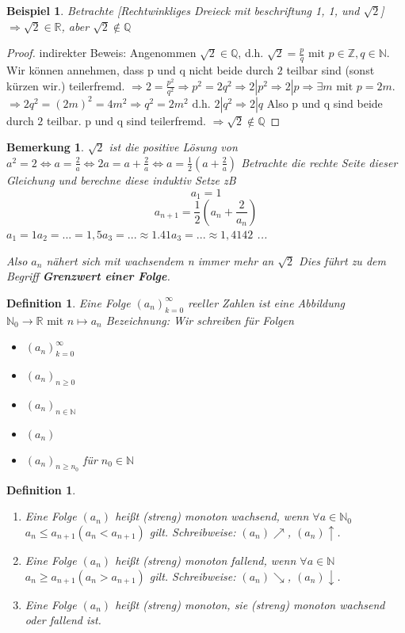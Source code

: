 \documentclass[a4paper,titlepage,oneside]{article}
\def\N{\ensuremath{\mathbb{N}} }
\def\Q{\ensuremath{\mathbb{Q}} }
\def\Z{\ensuremath{\mathbb{Z}} }
\def\R{\ensuremath{\mathbb{R}} }
\def\WSP{\text{\faBolt}}
\newcommand{\fain}[2]{\ensuremath{\forall#1\in#2}}
\theoremstyle{thmstyle}
\newtheorem{defi}[satz]{Definition}
\newtheorem{bsp}[satz]{Beispiel}
\newtheorem{bem}[satz]{Bemerkung}
\begin{document}
\begin{bsp}
Betrachte [Rechtwinkliges Dreieck mit beschriftung 1, 1, und $\sqrt{2}$]
\( \Rightarrow \sqrt{2} \in \R\), aber \(\sqrt{2} \not\in \Q\)
\end{bsp}
\begin{proof}
indirekter Beweis: Angenommen \(\sqrt{2} \in \Q\), d.h. 
$\sqrt{2} = \frac{p}{q}\text{ mit }p \in \Z, q \in \N.$
Wir können annehmen, dass p und q nicht beide durch $2$ teilbar sind (sonst kürzen wir.) teilerfremd.
\(\Rightarrow 2 = \frac{p^2}{q^2} \Rightarrow p^2 = 2q^2 \Rightarrow 2 | p^2 \Rightarrow 2 | p \Rightarrow \exists m \text{ mit } p = 2 m.\)
\( \Rightarrow 2q^2 = (2m)^2 = 4m^2 \Rightarrow q^2 = 2m^2 \text{ d.h. } 2 | q^2  \Rightarrow 2 | q \) Also p und q sind beide durch $2$ teilbar.  \WSP p und q sind teilerfremd. $\Rightarrow \sqrt{2} \not\in \Q$
\end{proof}

\begin{bem}
\( \sqrt{2} \) ist die positive Lösung von \(a^2 = 2 \Leftrightarrow a = \frac{2}{a} \Leftrightarrow  2a = a + \frac{2}{a} \Leftrightarrow a= \frac{1}{2}\left(a + \frac{2}{a}\right)\)
Betrachte die rechte Seite dieser Gleichung und berechne diese induktiv
Setze zB \[a_1 = 1 \] \[a_{n+1} = \frac{1}{2}\left(a_n + \frac{2}{a_n}\right)\]
\(a_1 = 1
a_2 = ... = 1,5
a_3 = ... \approx 1.41
a_3 = ... \approx 1,4142\)
...

Also $a_n$ nähert sich mit wachsendem n immer mehr an $\sqrt{2}$
Dies führt zu dem Begriff \textbf{Grenzwert einer Folge}.
\end{bem}

\begin{defi}
Eine Folge $(a_n)_{k=0}^{\infty}$ reeller Zahlen ist eine Abbildung $\N_0 \rightarrow \R\text{ mit } n \mapsto a_n$ 
Bezeichnung: Wir schreiben für Folgen
\begin{itemize}
\item $(a_n)_{k=0}^{\infty}$
\item $(a_n)_{n\ge0}$
\item $(a_n)_{n\in\N}$
\item $(a_n)$
\item $(a_n)_{n\ge n_0}$ für $n_0 \in \N$
\end{itemize}
\end{defi}

\begin{defi}
\begin{enumerate}
\item Eine Folge $(a_n)$ heißt (streng) monoton wachsend, wenn \fain{a}{\N_0} $a_n \le a_{n+1} (a_n < a_{n+1})$ gilt. Schreibweise: $(a_n)\nearrow$, $(a_n)\uparrow$.
\item Eine Folge $(a_n)$ heißt (streng) monoton fallend, wenn \fain{a}{\N} $a_n \ge a_{n+1} (a_n > a_{n+1})$ gilt. Schreibweise: $(a_n)\searrow$, $(a_n)\downarrow$.
\item Eine Folge $(a_n)$ heißt (streng) monoton, sie (streng) monoton wachsend oder fallend ist.
\end{enumerate}
\end{defi}
\end{document}

